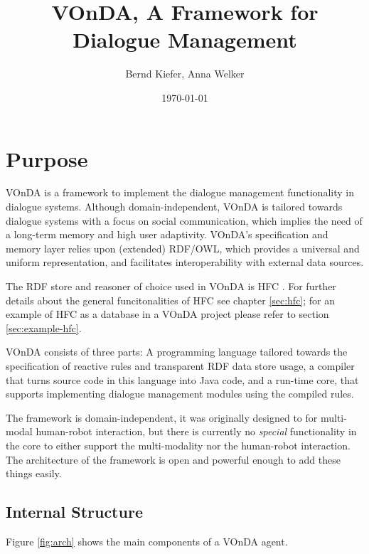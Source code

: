 \documentclass[a4paper]{report}
\newcommand{\vonda}{VOnDA\xspace}
\begin{document}
\title{\vonda, A Framework for Dialogue Management}

\author{Bernd Kiefer, Anna Welker}
\date{\today}

\maketitle

\tableofcontents

\chapter{Purpose}

\vonda is a framework to implement the dialogue management functionality in
dialogue systems. Although domain-independent, \vonda is tailored towards
dialogue systems with a focus on social communication, which implies the need
of a long-term memory and high user adaptivity. \vonda's specification and
memory layer relies upon (extended) RDF/OWL, which provides a universal and
uniform representation, and facilitates interoperability with external data
sources.

The RDF store and reasoner of choice used in \vonda is HFC \citep{krieger2013efficient}. For further details about the general funcitonalities of HFC see chapter \ref{sec:hfc}; for an example of HFC as a database in a \vonda project please refer to section \ref{sec:example-hfc}.

\vonda consists of three parts: A programming language tailored towards the
specification of reactive rules and transparent RDF data store usage, a
compiler that turns source code in this language into Java code, and a run-time
core, that supports implementing dialogue management modules using the compiled
rules.

The framework is domain-independent, it was originally designed to for
multi-modal human-robot interaction, but there is currently no \emph{special}
functionality in the core to either support the multi-modality nor the
human-robot interaction. The architecture of the framework is open and powerful
enough to add these things easily.


\section{Internal Structure}

Figure \ref{fig:arch} shows the main components of a \vonda agent.
\end{document}
